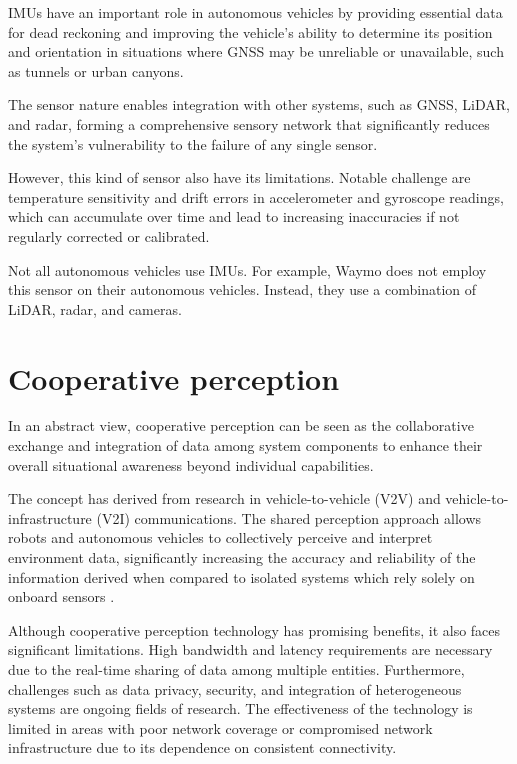 IMUs have an important role in autonomous vehicles by providing essential data for dead reckoning and improving the vehicle's ability to determine its position and orientation in situations where GNSS may be unreliable or unavailable, such as tunnels or urban canyons.

The sensor nature enables integration with other systems, such as GNSS, LiDAR, and radar, forming a comprehensive sensory network that significantly reduces the system's vulnerability to the failure of any single sensor.

However, this kind of sensor also have its limitations. Notable challenge are temperature sensitivity and drift errors in accelerometer and gyroscope readings, which can accumulate over time and lead to increasing inaccuracies if not regularly corrected or calibrated.

Not all autonomous vehicles use IMUs. For example, Waymo does not employ this sensor on their autonomous vehicles. Instead, they use a combination of LiDAR, radar, and cameras.

\section{Cooperative perception}\label{cooperative-perception}

In an abstract view, cooperative perception can be seen as the collaborative exchange and integration of data among system components to enhance their overall situational awareness beyond individual capabilities.

The concept has derived from research in vehicle-to-vehicle (V2V) and vehicle-to-infrastructure (V2I) communications. The shared perception approach allows robots and autonomous vehicles to collectively perceive and interpret environment data, significantly increasing the accuracy and reliability of the information derived when compared to isolated systems which rely solely on onboard sensors \cite{YU2022100023}.

Although cooperative perception technology has promising benefits, it also faces significant limitations. High bandwidth and latency requirements are necessary due to the real-time sharing of data among multiple entities. Furthermore, challenges such as data privacy, security, and integration of heterogeneous systems are ongoing fields of research. The effectiveness of the technology is limited in areas with poor network coverage or compromised network infrastructure due to its dependence on consistent connectivity.


